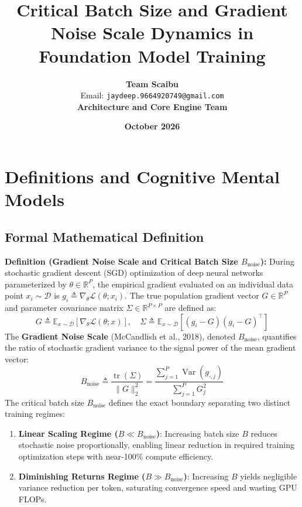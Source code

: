 \documentclass[11pt,a4paper]{article}
\title{\textbf{Critical Batch Size and Gradient Noise Scale Dynamics in Foundation Model Training}}
\author{\textbf{Team Scaibu} \\ \small Email: \texttt{jaydeep.9664920749@gmail.com} \\ \small \textbf{Architecture and Core Engine Team}}
\date{\textbf{October 2026}}
\theoremstyle{definition}
\begin{document}
\maketitle

\section{Definitions and Cognitive Mental Models}

\subsection{Formal Mathematical Definition}
\textbf{Definition (Gradient Noise Scale and Critical Batch Size $B_{\text{noise}}$):}
During stochastic gradient descent (SGD) optimization of deep neural networks parameterized by $\theta \in \mathbb{R}^P$, the empirical gradient evaluated on an individual data point $x_i \sim \mathcal{D}$ is $g_i \triangleq \nabla_\theta \mathcal{L}(\theta; x_i)$. The true population gradient vector $G \in \mathbb{R}^P$ and parameter covariance matrix $\Sigma \in \mathbb{R}^{P \times P}$ are defined as:
{\boldmath
\begin{equation}
G \triangleq \mathbb{E}_{x \sim \mathcal{D}}\left[ \nabla_\theta \mathcal{L}(\theta; x) \right], \quad \Sigma \triangleq \mathbb{E}_{x \sim \mathcal{D}}\left[ (g_i - G)(g_i - G)^\top \right]
\end{equation}
}
The \textbf{Gradient Noise Scale} (McCandlish et al., 2018), denoted $B_{\text{noise}}$, quantifies the ratio of stochastic gradient variance to the signal power of the mean gradient vector:
{\boldmath
\begin{equation}
B_{\text{noise}} \triangleq \frac{\operatorname{tr}(\Sigma)}{\|G\|_2^2} = \frac{\sum_{j=1}^P \operatorname{Var}(g_{\cdot, j})}{\sum_{j=1}^P G_j^2}
\end{equation}
}
The critical batch size $B_{\text{noise}}$ defines the exact boundary separating two distinct training regimes:
\begin{enumerate}
    \item \textbf{Linear Scaling Regime ($B \ll B_{\text{noise}}$)}: Increasing batch size $B$ reduces stochastic noise proportionally, enabling linear reduction in required training optimization steps with near-100\% compute efficiency.
    \item \textbf{Diminishing Returns Regime ($B \gg B_{\text{noise}}$)}: Increasing $B$ yields negligible variance reduction per token, saturating convergence speed and wasting GPU FLOPs.
\end{enumerate}
\end{document}
